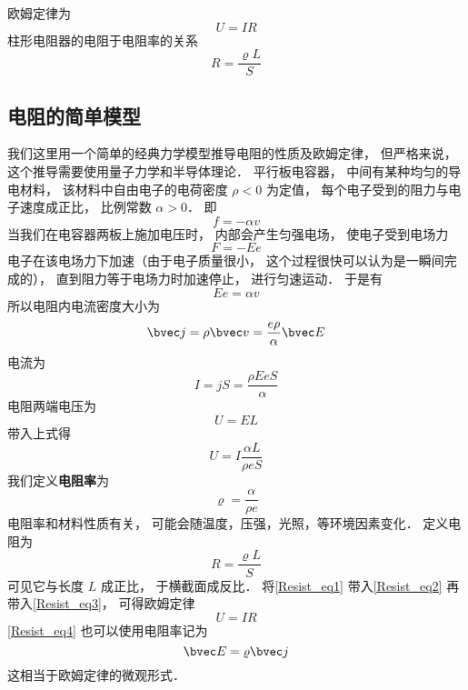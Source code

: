 

欧姆定律为
\begin{equation}
U = IR
\end{equation}
柱形电阻器的电阻于电阻率的关系
\begin{equation}
R = \frac{\varrho L}{S}
\end{equation}


\subsection{电阻的简单模型}
我们这里用一个简单的经典力学模型推导电阻的性质及欧姆定律， 但严格来说， 这个推导需要使用量子力学和半导体理论． 平行板电容器， 中间有某种均匀的导电材料， 该材料中自由电子的电荷密度 $\rho < 0$ 为定值， 每个电子受到的阻力与电子速度成正比， 比例常数 $\alpha > 0$． 即
\begin{equation}
f = -\alpha v
\end{equation}
当我们在电容器两板上施加电压时， 内部会产生匀强电场， 使电子受到电场力
\begin{equation}
F = -Ee
\end{equation}
电子在该电场力下加速（由于电子质量很小， 这个过程很快可以认为是一瞬间完成的）， 直到阻力等于电场力时加速停止， 进行匀速运动． 于是有
\begin{equation}
Ee = \alpha v
\end{equation}
所以电阻内电流密度大小为
\begin{equation}\label{Resist_eq4}
\bvec j = \rho \bvec v = \frac{e\rho}{\alpha}\bvec E
\end{equation}
电流为
\begin{equation}
I = jS = \frac{\rho EeS}{\alpha}
\end{equation}
电阻两端电压为
\begin{equation}
U = EL
\end{equation}
带入上式得
\begin{equation}\label{Resist_eq3}
U = I \frac{\alpha L}{\rho eS}
\end{equation}
我们定义\textbf{电阻率}为
\begin{equation}\label{Resist_eq1}
\varrho = \frac{\alpha}{\rho e}
\end{equation}
电阻率和材料性质有关， 可能会随温度，压强，光照，等环境因素变化． 定义电阻为
\begin{equation}\label{Resist_eq2}
R = \frac{\varrho L}{S}
\end{equation}
可见它与长度 $L$ 成正比， 于横截面成反比． 将\autoref{Resist_eq1} 带入\autoref{Resist_eq2} 再带入\autoref{Resist_eq3}， 可得欧姆定律
\begin{equation}
U = IR
\end{equation}
\autoref{Resist_eq4} 也可以使用电阻率记为
\begin{equation}
\bvec E = \varrho\bvec j
\end{equation}
这相当于欧姆定律的微观形式．
